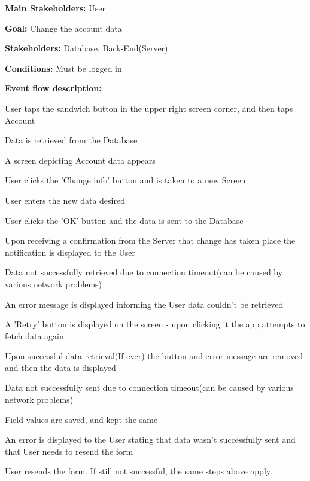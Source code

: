 				\noindent {}
				\begin{packed_item}
					\item \textbf{Main Stakeholders:} User
					\item \textbf{Goal:} Change the account data
					\item \textbf{Stakeholders:} Database, Back-End(Server)
					\item \textbf{Conditions:} Must be logged in
					\item \textbf{Event flow description: }
					\begin{packed_enum}
						\item User taps the sandwich button in the upper right screen corner, and then taps Account
						\item Data is retrieved from the Database
						\item A screen depicting Account data appears
						\item User clicks the 'Change info' button and is taken to a new Screen
						\item User enters the new data desired
						\item User clicks the 'OK' button and the data is sent to the Database
						\item Upon receiving a confirmation from the Server that change has taken place the notification is displayed to the User
					\end{packed_enum}
					
					\begin{packed_item}
						\item[2.a] Data not successfully retrieved due to connection timeout(can be caused by various network problems)
						\item[] \begin{packed_enum}
							\item An error message is displayed informing the User data couldn't be retrieved
							\item A 'Retry' button is displayed on the screen - upon clicking it the app attempts to fetch data again
							\item Upon successful data retrieval(If ever) the button and error message are removed and then the data is displayed
						\end{packed_enum}

						\item[6.a] Data not successfully sent due to connection timeout(can be caused by various network problems)
						\item[] \begin{packed_enum}
							\item Field values are saved, and kept the same
							\item An error is displayed to the User stating that data wasn't successfully sent and that User needs to resend the form
							\item User resends the form. If still not successful, the same steps above apply.
						\end{packed_enum}
						

\end{packed_item}
\end{packed_item}
